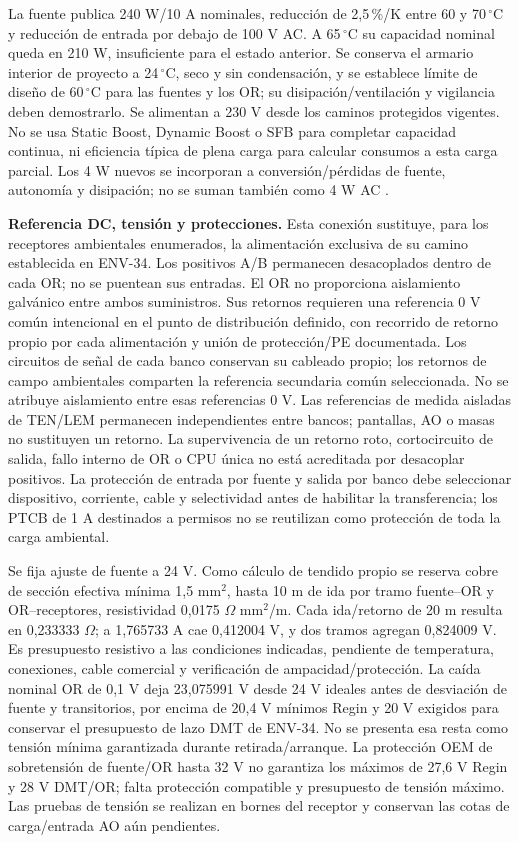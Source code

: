 La fuente publica 240 W/10 A nominales, reducción de 2,5\,\%/K entre 60 y 70\,$^{\circ}$C y reducción de entrada por debajo de 100 V AC. A 65\,$^{\circ}$C su capacidad nominal queda en 210 W, insuficiente para el estado anterior. Se conserva el armario interior de proyecto a 24\,$^{\circ}$C, seco y sin condensación, y se establece límite de diseño de 60\,$^{\circ}$C para las fuentes y los OR; su disipación/ventilación y vigilancia deben demostrarlo. Se alimentan a 230 V desde los caminos protegidos vigentes. No se usa Static Boost, Dynamic Boost o SFB para completar capacidad continua, ni eficiencia típica de plena carga para calcular consumos a esta carga parcial. Los 4 W nuevos se incorporan a conversión/pérdidas de fuente, autonomía y disipación; no se suman también como 4 W AC \parencite{lote40-quint-catalogo}.

\textbf{Referencia DC, tensión y protecciones.} Esta conexión sustituye, para los receptores ambientales enumerados, la alimentación exclusiva de su camino establecida en ENV-34. Los positivos A/B permanecen desacoplados dentro de cada OR; no se puentean sus entradas. El OR no proporciona aislamiento galvánico entre ambos suministros. Sus retornos requieren una referencia 0 V común intencional en el punto de distribución definido, con recorrido de retorno propio por cada alimentación y unión de protección/PE documentada. Los circuitos de señal de cada banco conservan su cableado propio; los retornos de campo ambientales comparten la referencia secundaria común seleccionada. No se atribuye aislamiento entre esas referencias 0 V. Las referencias de medida aisladas de TEN/LEM permanecen independientes entre bancos; pantallas, AO o masas no sustituyen un retorno. La supervivencia de un retorno roto, cortocircuito de salida, fallo interno de OR o CPU única no está acreditada por desacoplar positivos. La protección de entrada por fuente y salida por banco debe seleccionar dispositivo, corriente, cable y selectividad antes de habilitar la transferencia; los PTCB de 1 A destinados a permisos no se reutilizan como protección de toda la carga ambiental.

Se fija ajuste de fuente a 24 V. Como cálculo de tendido propio se reserva cobre de sección efectiva mínima 1,5 mm$^2$, hasta 10 m de ida por tramo fuente--OR y OR--receptores, resistividad 0,0175 $\Omega$ mm$^2$/m. Cada ida/retorno de 20 m resulta en 0,233333 $\Omega$; a 1,765733 A cae 0,412004 V, y dos tramos agregan 0,824009 V. Es presupuesto resistivo a las condiciones indicadas, pendiente de temperatura, conexiones, cable comercial y verificación de ampacidad/protección. La caída nominal OR de 0,1 V deja 23,075991 V desde 24 V ideales antes de desviación de fuente y transitorios, por encima de 20,4 V mínimos Regin y 20 V exigidos para conservar el presupuesto de lazo DMT de ENV-34. No se presenta esa resta como tensión mínima garantizada durante retirada/arranque. La protección OEM de sobretensión de fuente/OR hasta 32 V no garantiza los máximos de 27,6 V Regin y 28 V DMT/OR; falta protección compatible y presupuesto de tensión máximo. Las pruebas de tensión se realizan en bornes del receptor y conservan las cotas de carga/entrada AO aún pendientes.

